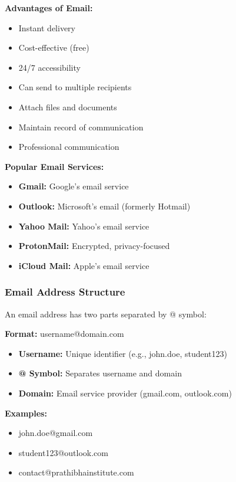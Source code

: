 \documentclass[12pt,a4paper]{article}
\begin{document}
\textbf{Advantages of Email:}
\begin{itemize}
    \item Instant delivery
    \item Cost-effective (free)
    \item 24/7 accessibility
    \item Can send to multiple recipients
    \item Attach files and documents
    \item Maintain record of communication
    \item Professional communication
\end{itemize}

\textbf{Popular Email Services:}
\begin{itemize}
    \item \textbf{Gmail:} Google's email service
    \item \textbf{Outlook:} Microsoft's email (formerly Hotmail)
    \item \textbf{Yahoo Mail:} Yahoo's email service
    \item \textbf{ProtonMail:} Encrypted, privacy-focused
    \item \textbf{iCloud Mail:} Apple's email service
\end{itemize}

\subsubsection{Email Address Structure}
An email address has two parts separated by @ symbol:

\textbf{Format:} username@domain.com

\begin{itemize}
    \item \textbf{Username:} Unique identifier (e.g., john.doe, student123)
    \item \textbf{@ Symbol:} Separates username and domain
    \item \textbf{Domain:} Email service provider (gmail.com, outlook.com)
\end{itemize}

\textbf{Examples:}
\begin{itemize}
    \item john.doe@gmail.com
    \item student123@outlook.com
    \item contact@prathibhainstitute.com
\end{itemize}
\end{document}
